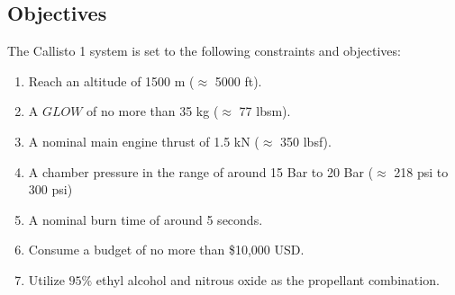 \documentclass[9pt]{article} %
\numberwithin{equation}{section} %
\begin{document}
\subsection{Objectives}
The Callisto 1 system is set to the following constraints and objectives:
\begin{enumerate}
\item Reach an altitude of 1500 m ($\approx$ 5000 ft).
\item A $GLOW$ of no more than 35 kg ($\approx$ 77 lbsm).
\item A nominal main engine thrust of 1.5 kN ($\approx$ 350 lbsf).
\item A chamber pressure in the range of around 15 Bar to 20 Bar ($\approx$ 218 psi to 300 psi)
\item A nominal burn time of around 5 seconds.
\item Consume a budget of no more than \$10,000 USD.
\item Utilize $95\%$ ethyl alcohol and nitrous oxide as the propellant combination.
\end{enumerate}
\end{document}
